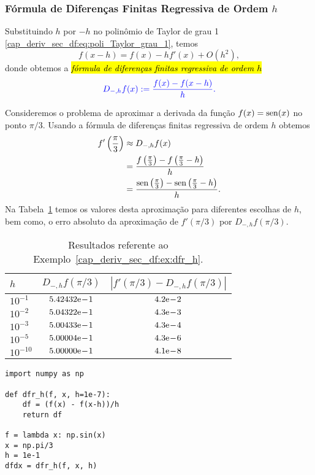 \subsubsection{Fórmula de Diferenças Finitas Regressiva de Ordem $h$}

Substituindo $h$ por $-h$ no polinômio de Taylor de grau 1 \eqref{cap_deriv_sec_df:eq:poli_Taylor_grau_1}, temos
\begin{equation}
  f(x-h) = f(x) - hf'(x) + O(h^2),
\end{equation}
donde obtemos a \hl{\emph{fórmula de diferenças finitas regressiva de ordem $h$}}
\begin{equation}\label{cap_deriv_sec_df:eq:dfr_h}\color{blue}D_{-,h}f(x) := \frac{f(x) - f(x-h)}{h}.
\end{equation}

\begin{ex}\label{cap_deriv_sec_df:ex:dfr_h}
  Consideremos o problema de aproximar a derivada da função $f(x) = \operatorname{sen}(x)$ no ponto $\pi/3$. Usando a fórmula de diferenças finitas regressiva de ordem $h$ obtemos
  \begin{subequations}
    \begin{align}
      f'\left(\frac{\pi}{3}\right) &\approx D_{-,h}f(x) \\
                                   &= \frac{f\left(\frac{\pi}{3}\right)-f\left(\frac{\pi}{3}-h\right)}{h}\\
                                   &= \frac{\operatorname{sen}\left(\frac{\pi}{3}\right)-\operatorname{sen}\left(\frac{\pi}{3}-h\right)}{h}. 
    \end{align}
  \end{subequations}
Na Tabela~\ref{cap_deriv_sec_df:tab:ex_dfr_h} temos os valores desta aproximação para diferentes escolhas de $h$, bem como, o erro absoluto da aproximação de $f'(\pi/3)$ por $D_{-,h}f(\pi/3)$.

\begin{table}[h!]
  \centering
  \caption{Resultados referente ao Exemplo~\ref{cap_deriv_sec_df:ex:dfr_h}.}
  \begin{tabular}{l|c|c}
    $h$ & $D_{-,h}f(\pi/3)$ & $|f'(\pi/3)-D_{-,h}f(\pi/3)|$\\ \hline
    $10^{-1}$ & $5.42432\mathrm{e}\!-\!1$ & $4.2\mathrm{e}\!-\!2$ \\
    $10^{-2}$ & $5.04322\mathrm{e}\!-\!1$ & $4.3\mathrm{e}\!-\!3$ \\
    $10^{-3}$ & $5.00433\mathrm{e}\!-\!1$ & $4.3\mathrm{e}\!-\!4$ \\
    $10^{-5}$ & $5.00004\mathrm{e}\!-\!1$ & $4.3\mathrm{e}\!-\!6$ \\
    $10^{-10}$ & $5.00000\mathrm{e}\!-\!1$ & $4.1\mathrm{e}\!-\!8$ \\\hline
  \end{tabular}
  \label{cap_deriv_sec_df:tab:ex_dfr_h}
\end{table}

\begin{lstlisting}[caption=dfr\_h.py]
import numpy as np

def dfr_h(f, x, h=1e-7):
    df = (f(x) - f(x-h))/h
    return df

f = lambda x: np.sin(x)
x = np.pi/3
h = 1e-1
dfdx = dfr_h(f, x, h)
\end{lstlisting}
\end{ex}

